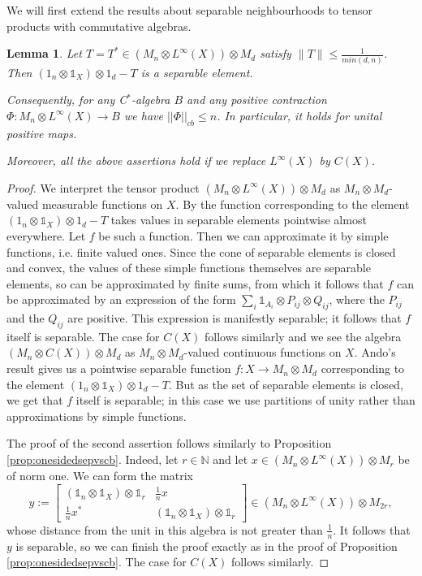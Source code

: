 \documentclass[11pt]{article}
\numberwithin{theorem}{section}
\newtheorem{lemma}[theorem]{Lemma}
\begin{document}
We will first extend the results about separable neighbourhoods to tensor products with commutative algebras.
\begin{lemma}\label{lem:separable}
Let $T=T^{\ast} \in (M_n \otimes L^{\infty}(X))\otimes M_d$ satisfy $\|T\|\leqslant \frac{1}{min(d,n)}$. Then $(1_{n} \otimes \mathds{1}_{X})\otimes 1_{d} - T$ is a separable element.

Consequently, for any C$^*$-algebra $B$ and any positive contraction $\Phi: M_n \otimes L^{\infty}(X)\rightarrow B$ we have  $||\Phi||_{cb}\leq n$. In particular, it holds for unital positive maps.

Moreover, all the above assertions hold if we replace $L^{\infty}(X)$ by $C(X)$.
\end{lemma}
\begin{proof}
We interpret the tensor product $(M_n \otimes L^{\infty}(X))\otimes M_d$ as $M_{n}\otimes M_{d}$-valued measurable functions on $X$. By \cite[Corrolary 8.4]{Ando} the function corresponding to the element $(1_{n} \otimes \mathds{1}_{X})\otimes 1_{d} - T$ takes values in separable elements pointwise almost everywhere. Let $f$ be such a function. Then we can approximate it by simple functions, i.e. finite valued ones. Since the cone of separable elements is closed and convex, the values of these simple functions  themselves are separable elements, so can be approximated by finite sums, from which it follows that $f$ can be approximated by an expression of the form $\sum_{i} \mathds{1}_{A_{i}} \otimes P_{ij} \otimes Q_{ij}$, where the $P_{ij}$ and the $Q_{ij}$ are positive. This expression is manifestly separable; it follows that $f$ itself is separable. The case for $C(X)$ follows similarly and we see the algebra $(M_n \otimes C(X))\otimes M_d$ as $M_{n}\otimes M_{d}$-valued continuous functions on $X$. Ando's result gives us a pointwise separable function $f: X\rightarrow M_{n}\otimes M_{d}$ corresponding to the element $(1_{n} \otimes \mathds{1}_{X})\otimes 1_{d} - T$. But as the set of separable elements is closed, we get that $f$ itself is separable; in this case we use partitions of unity rather than approximations by simple functions.

The proof of the second assertion follows similarly to Proposition \ref{prop:onesidedsepvscb}. Indeed, let $r \in \mathbb{N}$ and let $x \in (M_{n} \otimes L^{\infty}(X))\otimes M_{r}$ be of norm one. We can form the matrix 
\[
y:= \left[\begin{array}{cc} (\mathds{1}_{n} \otimes \mathds{1}_{X})\otimes \mathds{1}_{r} & \frac{1}{n} x \\ \frac{1}{n}x^{\ast} & (\mathds{1}_{n} \otimes \mathds{1}_{X})\otimes \mathds{1}_{r}\end{array}\right] \in (M_{n} \otimes L^{\infty}(X))\otimes M_{2r},
\]whose distance from the unit in this algebra is not greater than $\frac{1}{n}$. It follows that $y$ is separable, so we can finish the proof exactly as in the proof of Proposition \ref{prop:onesidedsepvscb}. The case for $C(X)$ follows similarly.
\end{proof}
\end{document}
